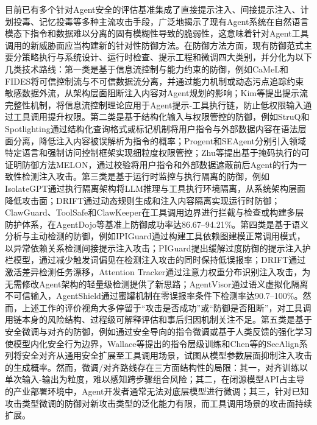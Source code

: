 目前已有多个针对Agent安全的评估基准\cite{zhang2024injectagent,balunovic2024agentdojo,zhang2025asb,li2026agentcanary}集成了直接提示注入、间接提示注入、计划投毒、记忆投毒等多种主流攻击手段，广泛地揭示了现有Agent系统在自然语言模态下指令和数据难以分离的固有模糊性导致的脆弱性，这意味着针对Agent工具调用的新威胁面应当构建新的针对性防御方法。在防御方法方面，现有防御范式主要分策略执行与系统设计、运行时检查、提示工程和微调四大类别\cite{ji2025taxonomy}，并分化为以下几类技术路线：第一类是基于信息流控制与能力约束的防御，例如CaMeL\cite{debenedetti2025camel}和FIDES\cite{costa2025fides}将可信控制流与不可信数据流分离，并通过能力机制或动态污点追踪约束敏感数据外流，从架构层面阻断注入内容对Agent规划的影响；Kim等\cite{kim2025promptflow}提出提示流完整性机制，将信息流控制理论应用于Agent提示-工具执行链，防止低权限输入通过工具调用提升权限。第二类是基于结构化输入与权限管控的防御，例如StruQ\cite{chen2025struq}和Spotlighting\cite{hines2024defending}通过结构化查询格式或标记机制将用户指令与外部数据内容在语法层面分离，降低注入内容被误解析为指令的概率；Progent\cite{shi2025progent}和SEAgent\cite{ji2026seagent}分别引入领域特定语言和强制访问控制框架实现细粒度权限管控；Zhu等\cite{zhu2025melon}提出基于掩码执行的可证明防御方法MELON，通过校验将用户指令和外部数据遮蔽前后Agent的行为一致性检测注入攻击。第三类是基于运行时监控与执行隔离的防御，例如IsolateGPT\cite{wu2025isolategpt}通过执行隔离架构将LLM推理与工具执行环境隔离，从系统架构层面降低攻击面；DRIFT\cite{li2025drift}通过动态规则生成和注入内容隔离实现运行时防御；ClawGuard\cite{zhao2026clawguard}、ToolSafe\cite{mou2026toolsafe}和ClawKeeper\cite{liu2026clawkeeper}在工具调用边界进行拦截与检查或构建多层防护体系，在AgentDojo等基准上防御成功率达86.67--94.21\%。第四类是基于语义分析与主动检测的防御，例如IPIGuard\cite{an2025ipiguard}通过构建工具依赖图建模正常调用模式，以异常依赖关系检测间接提示注入攻击；PIGuard\cite{li2025piguard}提出缓解过度防御的提示注入护栏模型，通过减少触发词偏见在检测注入攻击的同时保持低误报率；DRIFT\cite{abdelnabi2025drift}通过激活差异检测任务漂移，Attention Tracker\cite{hung2025attention}通过注意力权重分布识别注入攻击，为无需修改Agent架构的轻量级检测提供了新思路；AgentVisor\cite{ying2026agentvisor}通过语义虚拟化隔离不可信输入，AgentShield\cite{rassul2026agentshield}通过蜜罐机制在零误报率条件下检测率达90.7--100\%。然而，上述工作的评价视角大多停留于“攻击是否成功”或“防御是否阻断”，对工具调用链本身的风险结构、过程级可解释评估和事后归因机制关注不足。第五类是基于安全微调与对齐的防御，例如通过安全导向的指令微调\cite{ouyang2022training}或基于人类反馈的强化学习使模型内化安全行为边界，Wallace等\cite{wallace2024instruction}提出的指令层级训练和Chen等\cite{chen2025secalign,chen2025metasecalign}的SecAlign系列将安全对齐从通用安全扩展至工具调用场景，试图从模型参数层面抑制注入攻击的生成概率。然而，微调/对齐路线存在三方面结构性的局限：其一，对齐训练以单次输入-输出为粒度，难以感知跨步骤组合风险；其二，在闭源模型API占主导的产业部署环境中，Agent开发者通常无法对底层模型进行微调；其三，针对已知攻击类型微调的防御对新攻击类型的泛化能力有限，而工具调用场景的攻击面持续扩展。

